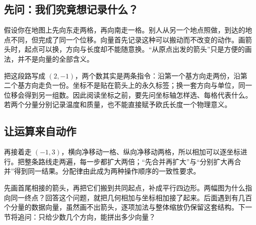\subsection*{先问：我们究竟想记录什么？}
假设你在地图上先向东走两格，再向南走一格。别人从另一个地点照做，到达的地点不同，但完成了同一个位移。向量首先记录这种可以搬动而不改变的动作。画箭头时，起点可以换，方向与长度却不能随意换。“从原点出发的箭头”只是方便的画法，并不是向量的全部含义。

把这段路写成 $(2,-1)$，两个数其实是两条指令：沿第一个基方向走两份，沿第二个基方向走负一份。坐标不是贴在箭头上的永久标签；换一套方向与单位，同一位移会得到另一组数。因此阅读坐标之前，要先问坐标轴怎样选、每格代表什么。若两个分量分别记录温度和质量，也不能直接赋予欧氏长度一个物理意义。

\subsection*{让运算来自动作}
再接着走 $(-1,3)$，横向净移动一格、纵向净移动两格，所以相加可以逐坐标进行。把整条路线走两遍，每一步都扩大两倍；“先合并再扩大”与“分别扩大再合并”得到同一结果。分配律由此成为两种操作顺序的一致性要求。

先画首尾相接的箭头，再把它们搬到共同起点，补成平行四边形。两幅图为什么指向同一终点？回答这个问题，就把几何相加与坐标相加接了起来。后面遇到有几百个分量的数据向量，虽然画不出箭头，逐项加法与整体缩放仍保留这套结构。下一节将追问：只给少数几个方向，能拼出多少向量？

